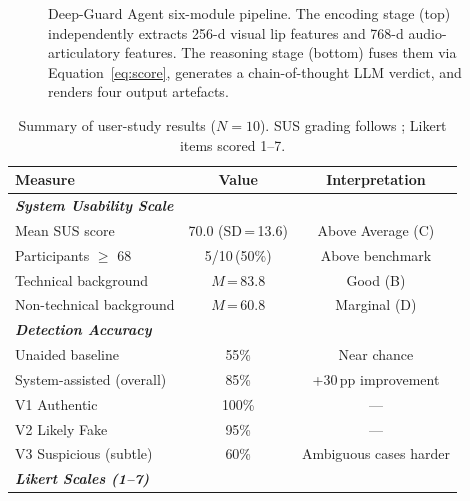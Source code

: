 \documentclass[12pt]{article}
\begin{document}
\begin{figure}[H]
\caption{Deep-Guard Agent six-module pipeline. The encoding stage (top)
independently extracts 256-d visual lip features and 768-d audio-articulatory
features. The reasoning stage (bottom) fuses them via Equation~\ref{eq:score},
generates a chain-of-thought LLM verdict, and renders four output artefacts.}
\label{fig:arch}
\end{figure}

\begin{table}[H]
\centering
\caption{Summary of user-study results ($N=10$). SUS grading follows
\citet{bangor2009}; Likert items scored 1--7.}
\label{tab:results}
\small
\renewcommand{\arraystretch}{1.15}
\begin{tabular}{p{5.8cm} c c}
\toprule
\textbf{Measure} & \textbf{Value} & \textbf{Interpretation} \\
\midrule
\multicolumn{3}{l}{\cellcolor{rowgray}\textit{\textbf{System Usability Scale}}} \\
\quad Mean SUS score             & 70.0 (SD\,=\,13.6)  & Above Average (C) \\
\quad Participants $\ge$ 68      & 5/10\,(50\%)         & Above benchmark \\
\quad Technical background       & $M$\,=\,83.8         & Good (B) \\
\quad Non-technical background   & $M$\,=\,60.8         & Marginal (D) \\
\midrule
\multicolumn{3}{l}{\cellcolor{rowgray}\textit{\textbf{Detection Accuracy}}} \\
\quad Unaided baseline           & 55\%                 & Near chance \\
\quad System-assisted (overall)  & 85\%                 & +30\,pp improvement \\
\quad V1 Authentic               & 100\%                & --- \\
\quad V2 Likely Fake             & 95\%                 & --- \\
\quad V3 Suspicious (subtle)     & 60\%                 & Ambiguous cases harder \\
\midrule
\multicolumn{3}{l}{\cellcolor{rowgray}\textit{\textbf{Likert Scales (1--7)}}} \\

\end{tabular}
\end{table}
\end{document}

